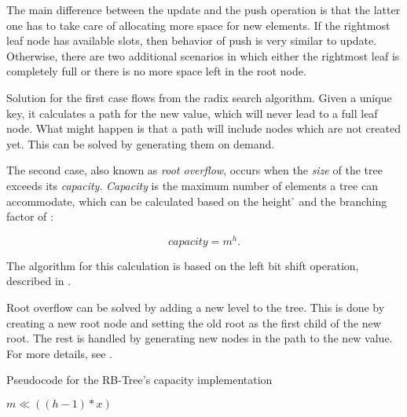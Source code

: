 The main difference between the update and the push operation is that the latter one has to take care of allocating more space for new elements. If the rightmost leaf node has available slots, then behavior of push is very similar to update. Otherwise, there are two additional scenarios in which either the rightmost leaf is completely full or there is no more space left in the root node. 

Solution for the first case flows from the radix search algorithm. Given a unique key, it calculates a path for the new value, which will never lead to a full leaf node. What might happen is that a path will include nodes which are not created yet. This can be solved by generating them on demand. 

The second case, also known as \emph{root overflow}, occurs when the \emph{size} of the tree exceeds its \emph{capacity}. \emph{Capacity} is the maximum number of elements a tree can accommodate, which can be calculated based on the height \h{} and the branching factor \m{} of \rbtree{}:

\begin{equation}
	capacity = m^h.
\end{equation}

The algorithm for this calculation is based on the left bit shift operation, described in . 

Root overflow can be solved by adding a new level to the tree. This is done by creating a new root node and setting the old root as the first child of the new root. The rest is handled by generating new nodes in the path to the new value. For more details, see . 

\begin{listing}[ht!]        
    \caption{Pseudocode for the RB-Tree's capacity implementation}
    \label{lst:rb-tree-capacity}
    
    \begin{algorithmic}
		\State \Return $m \ll ((h - 1) * x)$
        \EndFunction
    \end{algorithmic}
\end{listing}

